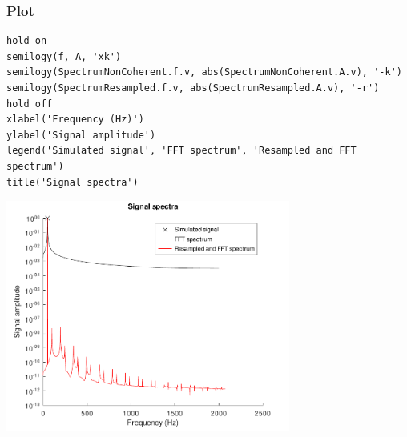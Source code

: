 {}
\subsubsection*{Plot}

\begin{lstlisting}
hold on
semilogy(f, A, 'xk')
semilogy(SpectrumNonCoherent.f.v, abs(SpectrumNonCoherent.A.v), '-k')
semilogy(SpectrumResampled.f.v, abs(SpectrumResampled.A.v), '-r')
hold off
xlabel('Frequency (Hz)')
ylabel('Signal amplitude')
legend('Simulated signal', 'FFT spectrum', 'Resampled and FFT spectrum')
title('Signal spectra')
\end{lstlisting}
\begin{center}
\includegraphics[width=0.7\textwidth]{algs_examples_published/SplineResample_alg_example-1.pdf}
\end{center}


\stopcontents[localtoc]
